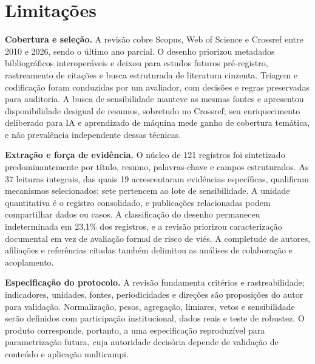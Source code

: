 \section{Limitações}
\label{sec:limitacoes}

\textbf{Cobertura e seleção.} A revisão cobre Scopus, Web of Science e Crossref entre 2010 e 2026, sendo o último ano parcial. O desenho priorizou metadados bibliográficos interoperáveis e deixou para estudos futuros pré-registro, rastreamento de citações e busca estruturada de literatura cinzenta. Triagem e codificação foram conduzidas por um avaliador, com decisões e regras preservadas para auditoria. A busca de sensibilidade manteve as mesmas fontes e apresentou disponibilidade desigual de resumos, sobretudo no Crossref; seu enriquecimento deliberado para IA e aprendizado de máquina mede ganho de cobertura temática, e não prevalência independente dessas técnicas.

\textbf{Extração e força de evidência.} O núcleo de 121 registros foi sintetizado predominantemente por título, resumo, palavras-chave e campos estruturados. As 37 leituras integrais, das quais 19 acrescentaram evidências específicas, qualificam mecanismos selecionados; sete pertencem ao lote de sensibilidade. A unidade quantitativa é o registro consolidado, e publicações relacionadas podem compartilhar dados ou casos. A classificação do desenho permaneceu indeterminada em 23,1\% dos registros, e a revisão priorizou caracterização documental em vez de avaliação formal de risco de viés. A completude de autores, afiliações e referências citadas também delimitou as análises de colaboração e acoplamento.

\textbf{Especificação do protocolo.} A revisão fundamenta critérios e rastreabilidade; indicadores, unidades, fontes, periodicidades e direções são proposições do autor para validação. Normalização, pesos, agregação, limiares, vetos e sensibilidade serão definidos com participação institucional, dados reais e teste de robustez. O produto corresponde, portanto, a uma especificação reproduzível para parametrização futura, cuja autoridade decisória depende de validação de conteúdo e aplicação multicampi.